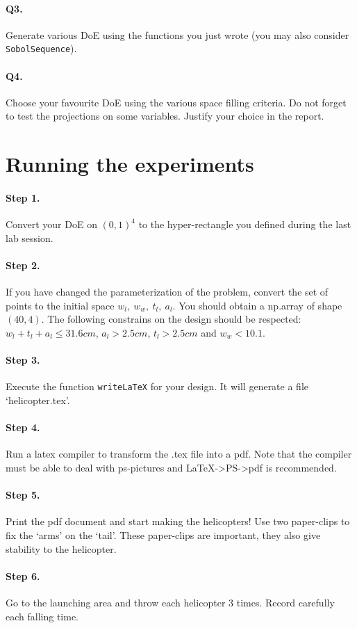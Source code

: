 \documentclass[12pt]{scrartcl}
\begin{document}
\paragraph{Q3.} Generate various DoE using the functions you just wrote (you may also consider \texttt{SobolSequence}). 

\paragraph{Q4.} Choose your favourite DoE using the various space filling criteria. Do not forget to test the projections on some variables. Justify your choice in the report. 

\section{Running the experiments}

\paragraph{Step 1.} Convert your DoE on $(0,1)^4$ to the hyper-rectangle you defined during the last lab session.

\paragraph{Step 2.} If you have changed the parameterization of the problem, convert the set of points to the initial space $w_l,\ w_w,\ t_l,\ a_l$. You should obtain a np.array of shape $(40,4)$. The following constrains on the design should be respected: $w_l + t_l + a_l \leq 31.6cm$, $a_l > 2.5cm$, $t_l > 2.5cm$ and $w_w < 10.1$.

\paragraph{Step 3.} Execute the function \texttt{writeLaTeX} for your design. It will generate a file `helicopter.tex'.

\paragraph{Step 4.} Run a latex compiler to transform the .tex file into a pdf. Note that the compiler must be able to deal with ps-pictures and LaTeX->PS->pdf is recommended.

\paragraph{Step 5.} Print the pdf document and start making the helicopters! Use two paper-clips to fix the `arms' on the `tail'. These paper-clips are important, they also give stability to the helicopter.

\paragraph{Step 6.} Go to the launching area and throw each helicopter 3 times. Record carefully each falling time.
\end{document}
